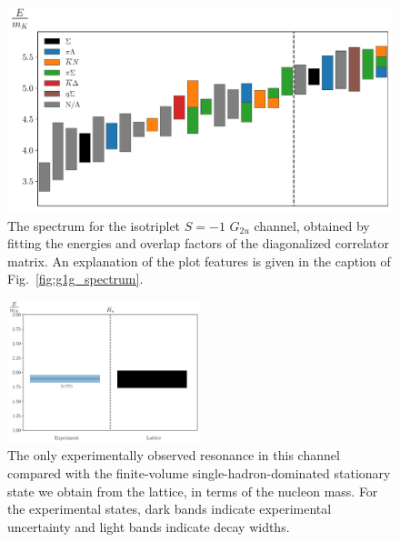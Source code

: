\begin{figure}[H]
    \centering
    \hspace*{-0.5in}\includegraphics[width=\textwidth]{figures/sigmas/g2u/staircase_mk.pdf}
    \caption[The spectrum for the isotriplet $S=-1$ $G_{2u}$ channel, obtained by fitting the energies and overlap factors of the diagonalized correlator matrix.]{The spectrum for the isotriplet $S=-1$ $G_{2u}$ channel, obtained by fitting the energies and overlap factors of the diagonalized correlator matrix. An explanation of the plot features is given in the caption of Fig.~\ref{fig:g1g_spectrum}.}\label{fig:g2u_spectrum}
\end{figure}

\begin{figure}[H]
    \centering
    \includegraphics[width=0.5\textwidth]{figures/sigmas/g2u/expvslat.pdf}
    \caption[The only experimentally observed resonance in this channel compared with the finite-volume single-hadron-dominated stationary state we obtain from the lattice, in terms of the nucleon mass.]{The only experimentally observed resonance in this channel compared with the finite-volume single-hadron-dominated stationary state we obtain from the lattice, in terms of the nucleon mass. For the experimental states, dark bands indicate experimental uncertainty and light bands indicate decay widths.}\label{fig:g2u_exp}
\end{figure}

